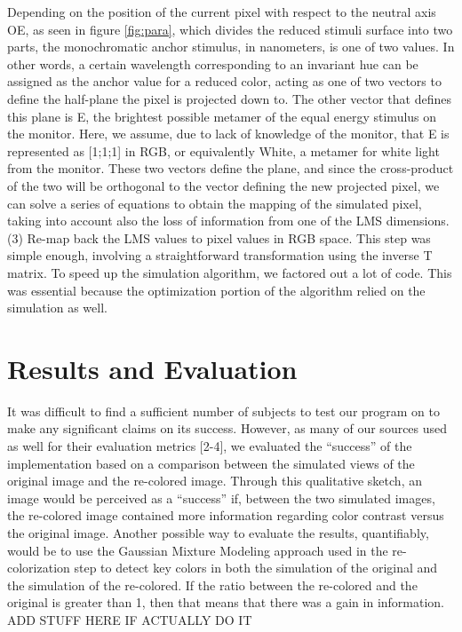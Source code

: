 \documentclass[10pt,twocolumn,letterpaper]{article}
\begin{document}
Depending on the position of the current pixel with respect to the neutral axis OE, as seen in figure \ref{fig:para}, which divides the reduced stimuli surface into two parts, the monochromatic anchor stimulus, in nanometers, is one of two values. In other words, a certain wavelength corresponding to an invariant hue can be assigned as the anchor value for a reduced color, acting as one of two vectors to define the half-plane the pixel is projected down to. The other vector that defines this plane is E, the brightest possible metamer of the equal energy stimulus on the monitor. Here, we assume, due to lack of knowledge of the monitor, that E is represented as [1;1;1] in RGB, or equivalently White, a metamer for white light from the monitor. These two vectors define the plane, and since the cross-product of the two will be orthogonal to the vector defining the new projected pixel, we can solve a series of equations to obtain the mapping of the simulated pixel, taking into account also the loss of information from one of the LMS dimensions. 
(3) 	Re-map back the LMS values to pixel values in RGB space.  This step was simple enough, involving a straightforward transformation using the inverse T matrix. To speed up the simulation algorithm, we factored out a lot of code. This was essential because the optimization portion of the algorithm relied on the simulation as well. 

\section{Results and Evaluation}

It was difficult to find a sufficient number of subjects to test our program on to make any significant claims on its success. However, as many of our sources used as well for their evaluation metrics [2-4], we evaluated the “success” of the implementation based on a comparison between the simulated views of the original image and the re-colored image. Through this qualitative sketch, an image would be perceived as a “success” if, between the two simulated images, the re-colored image contained more information regarding color contrast versus the original image. Another possible way to evaluate the results, quantifiably, would be to use the Gaussian Mixture Modeling approach used in the re-colorization step to detect key colors in both the simulation of the original and the simulation of the re-colored. If the ratio between the re-colored and the original is greater than 1, then that means that there was a gain in information.  ADD STUFF HERE IF ACTUALLY DO IT
\end{document}
